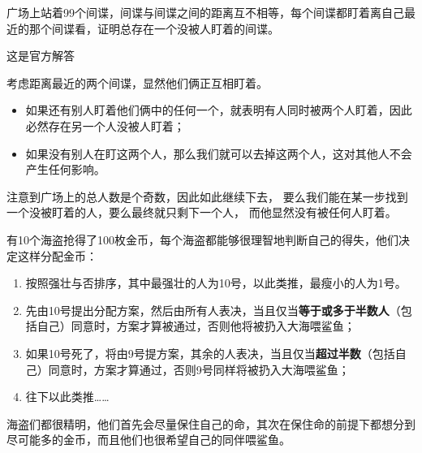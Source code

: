 \begin{questions}
    \question 广场上站着99个间谍，间谍与间谍之间的距离互不相等，每个间谍都盯着离自己最近的那个间谍看，证明总存在一个没被人盯着的间谍。

    \begin{solution}
        {
            \color{red}
            这是官方解答
        }

        考虑距离最近的两个间谍，显然他们俩正互相盯着。
        \begin{itemize}
            \item 如果还有别人盯着他们俩中的任何一个，就表明有人同时被两个人盯着，因此必然存在另一个人没被人盯着；
            \item 如果没有别人在盯这两个人，那么我们就可以去掉这两个人，这对其他人不会产生任何影响。
        \end{itemize}

        注意到广场上的总人数是个奇数，因此如此继续下去，
        要么我们能在某一步找到一个没被盯着的人，要么最终就只剩下一个人，
        而他显然没有被任何人盯着。
    \end{solution}

    \question 有10个海盗抢得了100枚金币，每个海盗都能够很理智地判断自己的得失，他们决定这样分配金币：
    \begin{enumerate}
        \item 按照强壮与否排序，其中最强壮的人为10号，以此类推，最瘦小的人为1号。
        \item 先由10号提出分配方案，然后由所有人表决，当且仅当\textbf{等于或多于半数人}（包括自己）同意时，方案才算被通过，否则他将被扔入大海喂鲨鱼；
        \item 如果10号死了，将由9号提方案，其余的人表决，当且仅当\textbf{超过半数}（包括自己）同意时，方案才算通过，否则9号同样将被扔入大海喂鲨鱼；
        \item 往下以此类推……
    \end{enumerate}
    海盗们都很精明，他们首先会尽量保住自己的命，其次在保住命的前提下都想分到尽可能多的金币，而且他们也很希望自己的同伴喂鲨鱼。




\end{questions}
